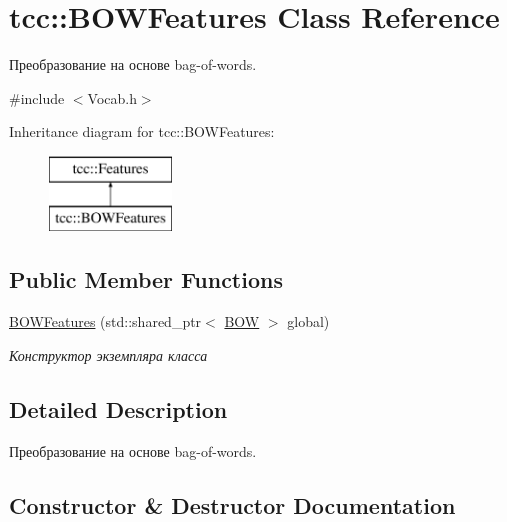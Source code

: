 \hypertarget{classtcc_1_1_b_o_w_features}{}\section{tcc\+:\+:B\+O\+W\+Features Class Reference}
\label{classtcc_1_1_b_o_w_features}


Преобразование на основе bag-\/of-\/words.  




{\ttfamily \#include $<$Vocab.\+h$>$}

Inheritance diagram for tcc\+:\+:B\+O\+W\+Features\+:\begin{figure}[H]
\begin{center}
\leavevmode
\includegraphics[height=2.000000cm]{classtcc_1_1_b_o_w_features}
\end{center}
\end{figure}
\subsection*{Public Member Functions}
\begin{DoxyCompactItemize}
\item 
\hyperlink{classtcc_1_1_b_o_w_features_a844e3c3dc3bd949c967d88cd695f41e5}{B\+O\+W\+Features} (std\+::shared\+\_\+ptr$<$ \hyperlink{classtcc_1_1_b_o_w}{B\+OW} $>$ global)
\begin{DoxyCompactList}\small\item\em Конструктор экземпляра класса \end{DoxyCompactList}\end{DoxyCompactItemize}


\subsection{Detailed Description}
Преобразование на основе bag-\/of-\/words. 

\subsection{Constructor \& Destructor Documentation}
